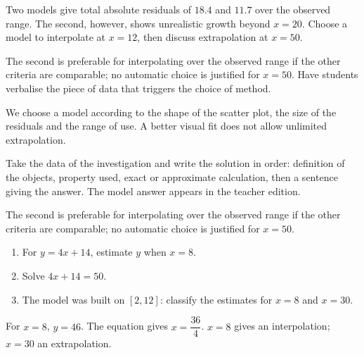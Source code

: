 \begin{activity}
Two models give total absolute residuals of $\num{18,4}$ and $\num{11,7}$ over the observed range. The second, however, shows unrealistic growth beyond $x=20$. Choose a model to interpolate at $x=12$, then discuss extrapolation at $x=50$.
\begin{center}\end{center}
\end{activity}
\begin{solution}The second is preferable for interpolating over the observed range if the other criteria are comparable; no automatic choice is justified for $x=50$. Have students verbalise the piece of data that triggers the choice of method.\end{solution}

\begin{summary}We choose a model according to the shape of the scatter plot, the size of the residuals and the range of use. A better visual fit does not allow unlimited extrapolation.\end{summary}

\begin{example}
Take the data of the investigation and write the solution in order: definition of the objects, property used, exact or approximate calculation, then a sentence giving the answer. The model answer appears in the teacher edition.
\end{example}
\begin{solution}The second is preferable for interpolating over the observed range if the other criteria are comparable; no automatic choice is justified for $x=50$.\end{solution}

\begin{exercise}[essential]
\begin{enumerate}\item For $y=4x+14$, estimate $y$ when $x=8$.\item Solve $4x+14=50$.\item The model was built on $[2,12]$: classify the estimates for $x=8$ and $x=30$.\end{enumerate}
\end{exercise}
\begin{solution}For $x=8$, $y=46$. The equation gives $x=\dfrac{36}{4}$. $x=8$ gives an interpolation; $x=30$ an extrapolation.\end{solution}

